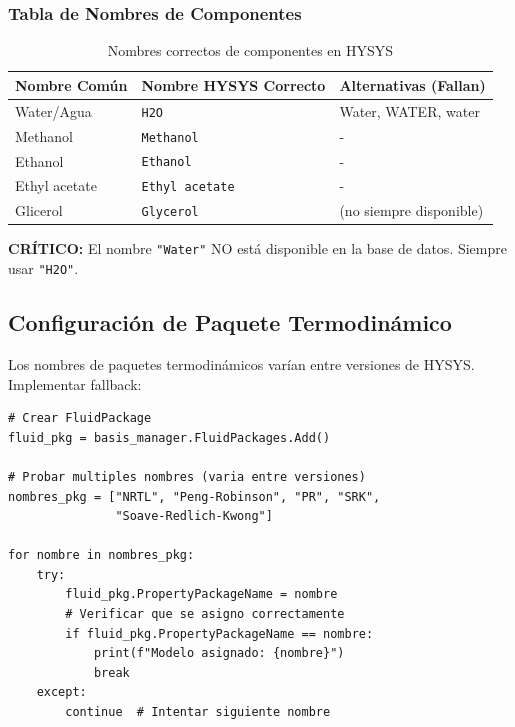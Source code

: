 \documentclass[12pt,a4paper]{article}
\begin{document}
\subsubsection{Tabla de Nombres de Componentes}

\begin{table}[h]
\centering
\begin{tabular}{@{}lll@{}}
\toprule
\textbf{Nombre Común} & \textbf{Nombre HYSYS Correcto} & \textbf{Alternativas (Fallan)} \\ \midrule
Water/Agua & \texttt{H2O} & Water, WATER, water \\
Methanol & \texttt{Methanol} & - \\
Ethanol & \texttt{Ethanol} & - \\
Ethyl acetate & \texttt{Ethyl acetate} & - \\
Glicerol & \texttt{Glycerol} & (no siempre disponible) \\ \bottomrule
\end{tabular}
\caption{Nombres correctos de componentes en HYSYS}
\label{tab:component_names}
\end{table}

\begin{warningbox}
\textbf{CRÍTICO:} El nombre \texttt{"Water"} NO está disponible en la base de datos. Siempre usar \texttt{"H2O"}.
\end{warningbox}

\subsection{Configuración de Paquete Termodinámico}

Los nombres de paquetes termodinámicos varían entre versiones de HYSYS. Implementar fallback:

\begin{lstlisting}
# Crear FluidPackage
fluid_pkg = basis_manager.FluidPackages.Add()

# Probar multiples nombres (varia entre versiones)
nombres_pkg = ["NRTL", "Peng-Robinson", "PR", "SRK",
               "Soave-Redlich-Kwong"]

for nombre in nombres_pkg:
    try:
        fluid_pkg.PropertyPackageName = nombre
        # Verificar que se asigno correctamente
        if fluid_pkg.PropertyPackageName == nombre:
            print(f"Modelo asignado: {nombre}")
            break
    except:
        continue  # Intentar siguiente nombre
\end{lstlisting}
\end{document}
